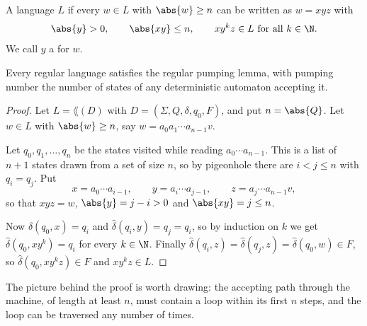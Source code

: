 \begin{definition}
	A language $L$  if every $w \in L$ with $\abs{w} \geq n$ can be written as $w = xyz$ with
	$$\abs{y} > 0, \qquad \abs{xy} \leq n, \qquad xy^kz \in L \text{ for all } k \in \N.$$
	We call $y$ a  for $w$.
\end{definition}

\begin{theorem}\label{thm:regpumping}
	Every regular language satisfies the regular pumping lemma, with pumping number the number of states of any deterministic automaton accepting it.
\end{theorem}

\begin{proof}
	Let $L = \lang(D)$ with $D = (\Sigma, Q, \delta, q_0, F)$, and put $n = \abs{Q}$. Let $w \in L$ with $\abs{w} \geq n$, say $w = a_0a_1\cdots a_{n-1}v$.

	Let $q_0, q_1, \dots, q_n$ be the states visited while reading $a_0 \cdots a_{n-1}$. This is a list of $n+1$ states drawn from a set of size $n$, so by pigeonhole there are $i < j \leq n$ with $q_i = q_j$. Put
	$$x = a_0\cdots a_{i-1}, \qquad y = a_i \cdots a_{j-1}, \qquad z = a_j \cdots a_{n-1}v,$$
	so that $xyz = w$, $\abs{y} = j - i > 0$ and $\abs{xy} = j \leq n$.

	Now $\hat\delta(q_0, x) = q_i$ and $\hat\delta(q_i, y) = q_j = q_i$, so by induction on $k$ we get $\hat\delta(q_0, xy^k) = q_i$ for every $k \in \N$. Finally $\hat\delta(q_i, z) = \hat\delta(q_j, z) = \hat\delta(q_0,w) \in F$, so $\hat\delta(q_0, xy^kz) \in F$ and $xy^kz \in L$.
\end{proof}

The picture behind the proof is worth drawing: the accepting path through the machine, of length at least $n$, must contain a loop within its first $n$ steps, and the loop can be traversed any number of times.

\begin{center}
\end{center}

